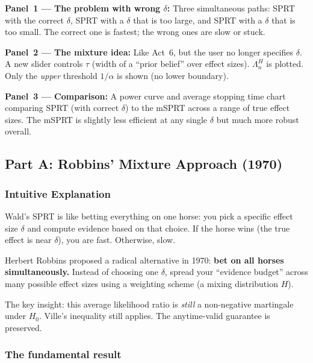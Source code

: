 \documentclass[12pt, a4paper]{article}
\newcommand{\LR}{\Lambda}              %
\begin{document}
\begin{simulation}
\textbf{Panel~1 --- The problem with wrong $\delta$:}
Three simultaneous paths: SPRT with the correct $\delta$, SPRT with a
$\delta$ that is too large, and SPRT with a $\delta$ that is too small.
The correct one is fastest; the wrong ones are slow or stuck.

\textbf{Panel~2 --- The mixture idea:}
Like Act~6, but the user no longer specifies $\delta$.  A new slider
controls $\tau$ (width of a ``prior belief'' over effect sizes).
$\LR_n^{H}$ is plotted.  Only the \emph{upper} threshold $1/\alpha$ is
shown (no lower boundary).

\textbf{Panel~3 --- Comparison:}
A power curve and average stopping time chart comparing SPRT (with correct
$\delta$) to the mSPRT across a range of true effect sizes.  The mSPRT is
slightly less efficient at any single $\delta$ but much more robust overall.
\end{simulation}

\subsection{Part A: Robbins' Mixture Approach (1970)}

\subsubsection*{Intuitive Explanation}

\begin{intuition}
Wald's SPRT is like betting everything on one horse: you pick a specific
effect size $\delta$ and compute evidence based on that choice.  If the horse
wins (the true effect is near $\delta$), you are fast.  Otherwise, slow.

Herbert Robbins proposed a radical alternative in 1970: \textbf{bet on all
horses simultaneously.}  Instead of choosing one $\delta$, spread your
``evidence budget'' across many possible effect sizes using a weighting
scheme (a mixing distribution $H$).

The key insight: this average likelihood ratio is \emph{still} a non-negative
martingale under $H_0$.  Ville's inequality still applies.  The anytime-valid
guarantee is preserved.
\end{intuition}

\subsubsection*{The fundamental result}
\end{document}
